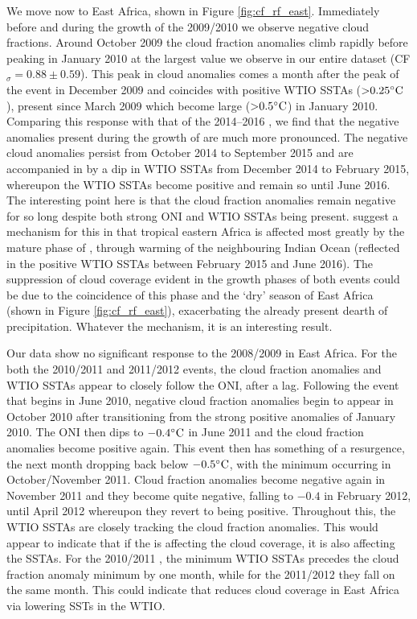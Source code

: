 We move now to East Africa, shown in Figure
\ref{fig:cf_rf_east}. Immediately before and during the growth of the
2009/2010 \elnino{} we observe negative cloud fractions. Around
October 2009 the cloud fraction anomalies climb rapidly before peaking
in January 2010 at the largest value we observe in our entire dataset
(CF$_{\sigma}=0.88\pm0.59$). This peak in cloud anomalies comes a month
after the peak of the \elnino{} event in December 2009 and coincides
with positive WTIO SSTAs (${>}0.25^{\circ}\mathrm{C}$), present since March 2009
which become large (${>}0.5^{\circ}\mathrm{C}$) in January 2010. Comparing this
response with that of the 2014--2016 \elnino{}, we find that the
negative anomalies present during the growth of \elnino{} are much
more pronounced. The negative cloud anomalies persist from October
2014 to September 2015 and are accompanied in by a dip in WTIO SSTAs
from December 2014 to February 2015, whereupon the WTIO SSTAs become
positive and remain so until June 2016. The interesting point here is
that the cloud fraction anomalies remain negative for so long despite
both strong ONI and WTIO SSTAs being present. \cite{parhi2016} suggest
a mechanism for this in that tropical eastern Africa is affected most
greatly by the mature phase of \elnino{}, through warming of the
neighbouring Indian Ocean (reflected in the positive WTIO SSTAs
between February 2015 and June 2016). The suppression of cloud
coverage evident in the growth phases of both \elnino{} events could be
due to the coincidence of this phase and the `dry' season of East
Africa (shown in Figure \ref{fig:cf_rf_east}), exacerbating the
already present dearth of precipitation. Whatever the mechanism, it is
an interesting result.

Our data show no significant response to the 2008/2009 \nina{} in East
Africa. For the both the 2010/2011 and 2011/2012 \nina{} events, the
cloud fraction anomalies and WTIO SSTAs appear to closely follow the
ONI, after a lag. Following the \nina event that begins in June 2010,
negative cloud fraction anomalies begin to appear in October 2010
after transitioning from the strong positive anomalies of January
2010. The ONI then dips to $-0.4^{\circ}\mathrm{C}$ in June 2011 and the cloud
fraction anomalies become positive again. This \nina{} event then has
something of a resurgence, the next month dropping back below
$-0.5^{\circ}\mathrm{C}$, with the minimum occurring in October/November
2011. Cloud fraction anomalies become negative again in November 2011
and they become quite negative, falling to $-0.4$ in February 2012,
until April 2012 whereupon they revert to being positive. Throughout
this, the WTIO SSTAs are closely tracking the cloud fraction
anomalies. This would appear to indicate that if the \nina{} is
affecting the cloud coverage, it is also affecting the SSTAs. For the
2010/2011 \nina{}, the minimum WTIO SSTAs precedes the cloud fraction
anomaly minimum by one month, while for the 2011/2012 \nina{} they
fall on the same month. This could indicate that \nina{} reduces cloud
coverage in East Africa via lowering SSTs in the WTIO.

